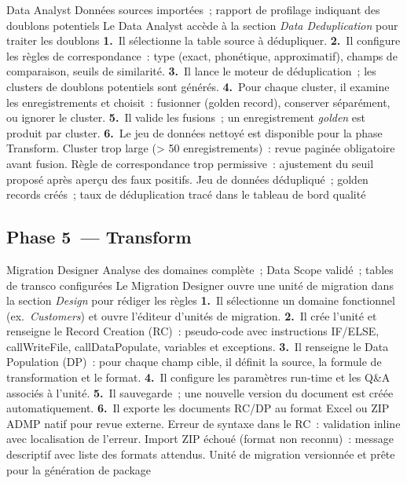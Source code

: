   {Data Analyst}
  {Données sources importées~; rapport de profilage indiquant des doublons potentiels}
  {Le Data Analyst accède à la section \textit{Data Deduplication} pour traiter les doublons}
  {\textbf{1.}~Il sélectionne la table source à dédupliquer.\newline
   \textbf{2.}~Il configure les règles de correspondance~: type (exact, phonétique, approximatif), champs de comparaison, seuils de similarité.\newline
   \textbf{3.}~Il lance le moteur de déduplication~; les clusters de doublons potentiels sont générés.\newline
   \textbf{4.}~Pour chaque cluster, il examine les enregistrements et choisit~: fusionner (golden record), conserver séparément, ou ignorer le cluster.\newline
   \textbf{5.}~Il valide les fusions~; un enregistrement \textit{golden} est produit par cluster.\newline
   \textbf{6.}~Le jeu de données nettoyé est disponible pour la phase Transform.}
  {Cluster trop large (> 50 enregistrements)~: revue paginée obligatoire avant fusion. Règle de correspondance trop permissive~: ajustement du seuil proposé après aperçu des faux positifs.}
  {Jeu de données dédupliqué~; golden records créés~; taux de déduplication tracé dans le tableau de bord qualité}

\subsection*{Phase 5~--- Transform}

  {Migration Designer}
  {Analyse des domaines complète~; Data Scope validé~; tables de transco configurées}
  {Le Migration Designer ouvre une unité de migration dans la section \textit{Design} pour rédiger les règles}
  {\textbf{1.}~Il sélectionne un domaine fonctionnel (ex.~\textit{Customers}) et ouvre l'éditeur d'unités de migration.\newline
   \textbf{2.}~Il crée l'unité et renseigne le Record Creation (RC)~: pseudo-code avec instructions IF/ELSE, callWriteFile, callDataPopulate, variables et exceptions.\newline
   \textbf{3.}~Il renseigne le Data Population (DP)~: pour chaque champ cible, il définit la source, la formule de transformation et le format.\newline
   \textbf{4.}~Il configure les paramètres run-time et les Q\&A associés à l'unité.\newline
   \textbf{5.}~Il sauvegarde~; une nouvelle version du document est créée automatiquement.\newline
   \textbf{6.}~Il exporte les documents RC/DP au format Excel ou ZIP ADMP natif pour revue externe.}
  {Erreur de syntaxe dans le RC~: validation inline avec localisation de l'erreur. Import ZIP échoué (format non reconnu)~: message descriptif avec liste des formats attendus.}
  {Unité de migration versionnée et prête pour la génération de package}

